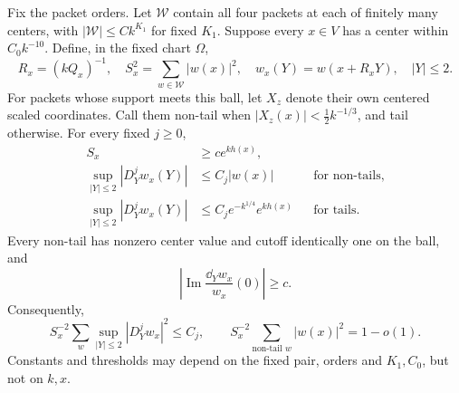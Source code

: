\begin{lemma}\label{lem:scaled}
Fix the packet orders. Let \(\mathcal W\) contain all four packets
at each of finitely many centers, with
\(|\mathcal W|\le Ck^{K_1}\) for fixed \(K_1\).
Suppose every \(x\in V\) has a center within \(C_0k^{-10}\).
Define, in the fixed chart \(\Omega\),
\[
 R_x=(kQ_x)^{-1},\quad
 S_x^2=\sum_{w\in\mathcal W}|w(x)|^2,\quad
 w_x(Y)=w(x+R_xY),\quad |Y|\le2.
\]
For packets whose support meets this ball, let \(X_z\) denote
their own centered scaled coordinates. Call them non-tail when
\(|X_z(x)|<\tfrac12k^{-1/3}\), and tail otherwise.
For every fixed \(j\ge0\),
\begin{align}
 S_x&\ge ce^{kh(x)},\label{eq:variance}\\
 \sup_{|Y|\le2}|D_Y^jw_x(Y)|
 &\le C_j|w(x)| &&\text{for non-tails},\label{eq:nontail}\\
 \sup_{|Y|\le2}|D_Y^jw_x(Y)|
 &\le C_j e^{-k^{1/4}}e^{kh(x)}
                         &&\text{for tails}.\label{eq:abstail}
\end{align}
Every non-tail has nonzero center value and cutoff identically
one on the ball, and
\begin{equation}\label{eq:imaginary}
 \left|\operatorname{Im}\frac{\dd_Yw_x}{w_x}(0)\right|\ge c.
\end{equation}
Consequently,
\begin{equation}\label{eq:squares}
 S_x^{-2}\sum_w\sup_{|Y|\le2}|D_Y^jw_x|^2\le C_j,\qquad
 S_x^{-2}\sum_{\text{non-tail }w}|w(x)|^2=1-o(1).
\end{equation}
Constants and thresholds may depend on the fixed pair, orders
and \(K_1,C_0\), but not on \(k,x\).
\end{lemma}

